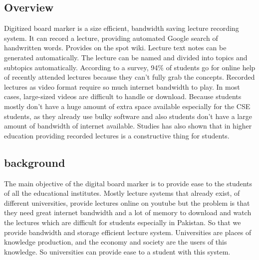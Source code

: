 \documentclass[conference]{IEEEtran}
\begin{document}
\subsection{Overview}
Digitized board marker is a size efficient, bandwidth saving lecture recording system. It can record a lecture, providing automated Google search of handwritten words. Provides on the spot wiki. Lecture text notes can be generated automatically. The lecture can be named and divided into topics and subtopics automatically. According to a survey, 94\% of students go for online help of recently attended lectures because they can’t fully grab the concepts. Recorded lectures as video format require so much internet bandwidth to play. In most cases, large-sized videos are difficult to handle or download. Because students mostly don’t have a huge amount of extra space available especially for the CSE students, as they already use bulky software and also students don’t have a large amount of bandwidth of internet available. Studies has also shown that in higher education providing recorded lectures is a constructive thing for students.\cite{b7}
\subsection{background}
The main objective of the digital board marker is to provide ease to the students of all the educational institutes. Mostly lecture systems that already exist, of different universities, provide lectures online on youtube but the problem is that they need great internet bandwidth and a lot of memory to download and watch the lectures which are difficult for students especially in Pakistan. So that we provide bandwidth and storage efficient lecture system. Universities are places of knowledge production, and the economy and society are the users of this knowledge. So universities can provide ease to a student with this system. 
\end{document}
